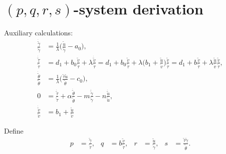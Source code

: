 \documentclass[a4paper,11pt]{article}
\def\tg{{\tilde{\gamma}}}
\def\tv{{\tilde{v}}}
\def\tth{{\tilde{\theta}}}
\def\ts{{\tilde{\tau}}}
\def\tu{{\tilde{u}}}
\def\dtg{\dot{\tilde{\gamma}}}
\def\dtv{\dot{\tilde{v}}}
\def\dtth{\dot{\tilde{\theta}}}
\def\dts{\dot{\tilde{\tau}}}
\def\dtu{\dot{\tilde{u}}}
\begin{document}
\section{$(p,q,r,s)$-system derivation}
Auxiliary calculations:
\begin{align*}
 \frac{\dtg}{\tg} &= \frac{1}{\lambda }\Big(\frac{\tu}{\tg}-a_0\Big),\\
 \frac{\dts}{\ts} &= d_1+ b_0\frac{\tv}{\ts} + \lambda \frac{\dtv}{\ts} = d_1+ b_0\frac{\tv}{\ts} + \lambda \Big(b_1 + \frac{\tu}{\tv}\Big)\frac{\tv}{\ts} = d_1 + b\frac{\tv}{\ts} + \lambda\frac{\tu}{\tv}\frac{\tv}{\ts} ,\\
 \frac{\dtth}{\tth}&=\frac{1}{\lambda }\Big(\frac{\ts\tu}{\tth}-c_0\Big),\\
 0&=\frac{\dts}{\ts} +\alpha \frac{\dtth}{\tth} - m \frac{\dtg}{\tg} - n\frac{\dtu}{\tu},\\
 \frac{\dtv}{\tv}&= b_1 +\frac{\tu}{\tv}
\end{align*}

Define 
\begin{equation}\label{eq:pqrsdef}
 \begin{aligned}
  p &= \frac{\tg}{\ts}, & q&=b \frac{\tv}{\ts}, &  r &= \frac{\tu}{\tg}, & s&=\frac{\ts\tg}{\tth}.
 \end{aligned}
\end{equation}
\end{document}
